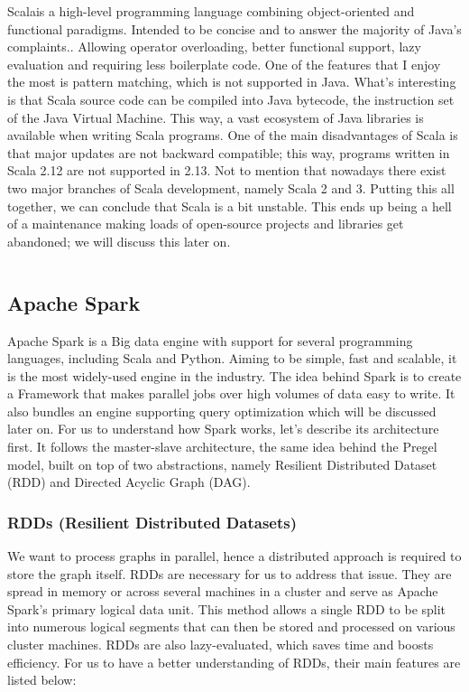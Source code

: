 Scala\footnotemark is a high-level programming language combining object-oriented and functional paradigms. Intended to be concise and to answer the majority of Java's complaints.\footnotemark. Allowing operator overloading, better functional support, lazy evaluation and requiring less boilerplate code. One of the features that I enjoy the most is pattern matching, which is not supported in Java. What's interesting is that Scala source code can be compiled into Java bytecode, the instruction set of the Java Virtual Machine. This way, a vast ecosystem of Java libraries is available when writing Scala programs. One of the main disadvantages of Scala is that major updates are not backward compatible; this way, programs written in Scala 2.12 are not supported in 2.13. Not to mention that nowadays there exist two major branches of Scala development, namely Scala 2 and 3. Putting this all together, we can conclude that Scala is a bit unstable. This ends up being a hell of a maintenance making loads of open-source projects and libraries get abandoned; we will discuss this later on.

\begin{code}
    \inputminted{scala}{code/listings/7-1_helloWorld.scala}
\end{code}

\subsection{Apache Spark}

Apache Spark is a Big data engine with support for several programming languages, including Scala and Python. Aiming to be simple, fast and scalable, it is the most widely-used engine in the industry. The idea behind Spark is to create a Framework that makes parallel jobs over high volumes of data easy to write. It also bundles an engine supporting query optimization which will be discussed later on. For us to understand how Spark works, let's describe its architecture first. It follows the master-slave architecture, the same idea behind the Pregel model, built on top of two abstractions, namely Resilient Distributed Dataset (RDD) and Directed Acyclic Graph (DAG).

\subsubsection{RDDs (Resilient Distributed Datasets)}

We want to process graphs in parallel, hence a distributed approach is required to store the graph itself. RDDs are necessary for us to address that issue. They are spread in memory or across several machines in a cluster and serve as Apache Spark's primary logical data unit. This method allows a single RDD to be split into numerous logical segments that can then be stored and processed on various cluster machines. RDDs are also lazy-evaluated, which saves time and boosts efficiency. For us to have a better understanding of RDDs, their main features are listed below:

